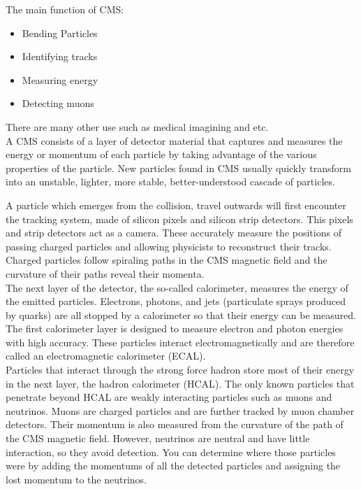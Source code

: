 The main function of CMS:
\begin{itemize}
    \item Bending Particles
    \item Identifying tracks
    \item Measuring energy
    \item Detecting muons
\end{itemize}
There are many other use such as medical imagining and etc.\\
A CMS consists of a layer of detector material that captures and measures the energy or momentum of each particle by taking advantage of the various properties of the particle. New particles found in CMS usually quickly transform into an unstable, lighter, more stable, better-understood cascade of particles.




A particle which emerges from the collision, travel outwards will first encounter the tracking system, made of silicon pixels and silicon strip detectors\cite{Sirunyan_2021}. This pixels and strip detectors act as a camera. These accurately measure the positions of passing charged particles and allowing physicists to reconstruct their tracks. Charged particles follow spiraling paths in the CMS magnetic field and the curvature of their paths reveal their momenta.\cite{CMS_3}\\
The  next layer of the detector, the so-called calorimeter, measures the energy of the emitted particles. Electrons, photons, and jets (particulate sprays produced by quarks) are all  stopped by a calorimeter so that their energy can be measured. The first calorimeter layer is designed to measure electron and photon energies  with high accuracy. These particles interact electromagnetically and are therefore called an electromagnetic calorimeter (ECAL)\cite{CMS_4}.\\

Particles that interact through the strong force hadron store most of their energy in the next layer, the hadron calorimeter (HCAL). The only known particles that penetrate beyond  HCAL are  weakly interacting particles such as muons and neutrinos. Muons are charged particles and are further tracked by muon chamber detectors. Their momentum is also measured from the curvature of the path of the CMS magnetic field. However, neutrinos are neutral and have little interaction, so they avoid detection. You can determine where those particles were by adding  the momentums of all the detected particles and assigning the lost momentum to the neutrinos.\\

